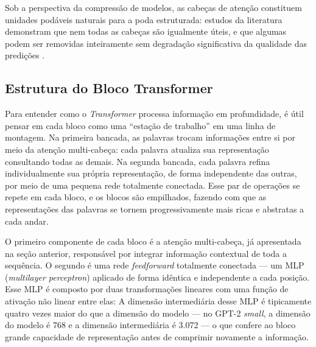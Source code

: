 Sob a perspectiva da compressão de modelos, as cabeças de atenção constituem unidades
podáveis naturais para a poda estruturada: estudos da literatura demonstram que nem todas
as cabeças são igualmente úteis, e que algumas podem ser removidas inteiramente sem
degradação significativa da qualidade das predições \cite{Michel2019}. 


\subsection{Estrutura do Bloco Transformer}\label{subsec:bloco_transformer}

Para entender como o \textit{Transformer} processa informação em profundidade, é útil
pensar em cada bloco como uma ``estação de trabalho'' em uma linha de montagem. Na
primeira bancada, as palavras trocam informações entre si por meio da atenção
multi-cabeça: cada palavra atualiza sua representação consultando todas as demais. Na
segunda bancada, cada palavra refina individualmente sua própria representação, de forma
independente das outras, por meio de uma pequena rede totalmente conectada.
Esse par de operações se repete em cada bloco, e os blocos são empilhados, fazendo com
que as representações das palavras se tornem progressivamente mais ricas e abstratas a
cada andar.

O primeiro componente de cada bloco é a
atenção multi-cabeça, já apresentada na seção anterior, responsável por
integrar informação contextual de toda a sequência. O segundo é uma rede
\textit{feedforward} totalmente conectada --- um MLP (\textit{multilayer perceptron})
aplicado de forma idêntica e independente a cada posição. Esse MLP é composto por duas
transformações lineares com uma função de ativação não linear entre elas:  A
dimensão intermediária desse MLP é tipicamente quatro vezes maior do que a dimensão
do modelo --- no GPT-2 \textit{small}, a dimensão do modelo é 768 e a dimensão
intermediária é 3.072 --- o que confere ao bloco grande capacidade de representação antes
de comprimir novamente a informação.

